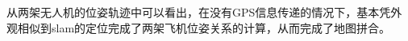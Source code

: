 从两架无人机的位姿轨迹中可以看出，在没有GPS信息传递的情况下，基本凭外观相似到slam的定位完成了两架飞机位姿关系的计算，从而完成了地图拼合。



































